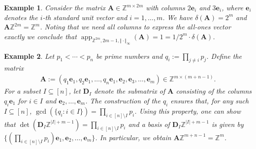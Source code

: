 \documentclass[pdflatex]{sn-jnl}
\DeclareMathOperator{\app}{app}
\newcommand{\Z}{\mathbb{Z}}
\newcommand{\bA}{\bm{A}}
\newcommand{\be}{\bm{e}}
\newcommand{\bD}{\bm{D}}
\theoremstyle{thmstyleone}%
\theoremstyle{thmstyletwo}%
\newtheorem{example}{Example}%
\theoremstyle{thmstylethree}%
\begin{document}
	\begin{example}
		Consider the matrix $\bA\in\Z^{m\times 2m}$ with columns  $2\be_i$ and $3\be_i$, where $\be_i$ denotes the $i$-th standard unit vector and $i=1,\ldots,m$.
		We have $\delta(\bA)=2^m$ and $\bA\Z^{2m}=\Z^m$.
		Noting that we need all columns to express the all-ones vector exactly we conclude that $\app_{\Z^{2m},2m-1,\Vert\cdot\Vert_\infty}(\bA)= 1 = 1/2^m\cdot\delta(\bA)$.
	\end{example}
	
	\begin{example}
		\label{ex_lattice_exponential_behavior}
		Let $p_1<\cdots<p_n$ be prime numbers and $q_i :=\prod_{j\neq i}p_j$. 
		Define the matrix 
		\begin{align*}
			\bA := (q_1 \be_1,q_2 \be_1,\ldots,q_n \be_1,\be_2,\be_3,\ldots,\be_m)\in\Z^{m\times (m+n-1)}.
		\end{align*}
		For a subset $I\subseteq[n]$, let $\bD_I$ denote the submatrix of $\bA$ consisting of the columns $q_i\be_1$ for $i\in I$ and $\be_2,\ldots,\be_m$. The construction of the $q_i$ ensures that, for any such $I\subseteq[n]$, $\gcd(\{q_i:i\in I\})=\prod_{i\in[n]\setminus I}p_i$.
		Using this property, one can show that $\det(\bD_I\Z^{|I|+m-1})=\prod_{i\in[n]\setminus I}p_i$ and
		a basis of $\bD_I\Z^{|I|+m-1}$ is given by $\lbrace(\prod_{i\in[n]\setminus I}p_i)\be_1,\be_2,\ldots,\be_m\rbrace$.
		In particular, we obtain $\bA\Z^{m+n-1}=\Z^m$.
		

\end{example}
\end{document}
